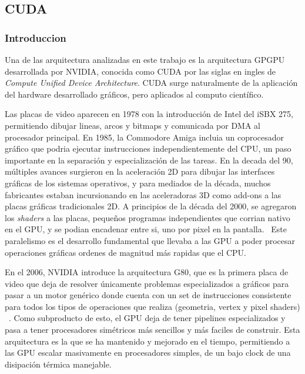 \subsection{CUDA}

\subsubsection{Introduccion}

Una de las arquitectura analizadas en este trabajo es la arquitectura GPGPU desarrollada por NVIDIA, conocida
como CUDA por las siglas en ingles de \textit{Compute Unified Device Architecture}.
CUDA surge naturalmente de la aplicaci\'on del hardware desarrollado gr\'aficos, pero aplicados al computo cient\'ifico.

Las placas de video aparecen en 1978 con la introducci\'on de Intel del iSBX 275, permitiendo dibujar lineas,
arcos y bitmaps y comunicada por DMA al procesador principal. En 1985, la Commodore Amiga incluia un coprocesador
gr\'afico que podria ejecutar instrucciones independientemente del CPU, un paso importante en la separaci\'on
y especializaci\'on de las tareas. En la decada del 90, m\'ultiples
avances surgieron en la aceleraci\'on 2D para dibujar las interfaces gr\'aficas de los sistemas operativos,
y para mediados de la d\'ecada, muchos fabricantes estaban incursionando en las aceleradoras 3D como
add-ons a las placas gr\'aficas tradicionales 2D. A principios de la d\'ecada del 2000, se agregaron los
\textit{shaders} a las placas, peque\~nos programas independientes que corrian nativo en el GPU,
y se podian encadenar entre si, uno por pixel en la pantalla.~\cite{CG} Este paralelismo es el desarrollo fundamental
que llevaba a las GPU a poder procesar operaciones gr\'aficas ordenes de magnitud m\'as rapidas que el CPU.

En el 2006, NVIDIA introduce la arquitectura G80,
que es la primera placa de video que deja de resolver \'unicamente problemas especializados a gr\'aficos
para pasar a un motor gen\'erico donde cuenta con un set de instrucciones consistente para todos los
tipos de operaciones que realiza (geometria, vertex y pixel shaders) ~\cite{cudaHandbook}. Como subproducto de esto,
el GPU deja de tener pipelines especializados y pasa a tener procesadores sim\'etricos m\'as sencillos y m\'as
faciles de construir. Esta arquitectura es la que se ha mantenido y mejorado en el tiempo, permitiendo
a las GPU escalar masivamente en procesadores simples, de un bajo clock de una disipaci\'on t\'ermica
manejable.

